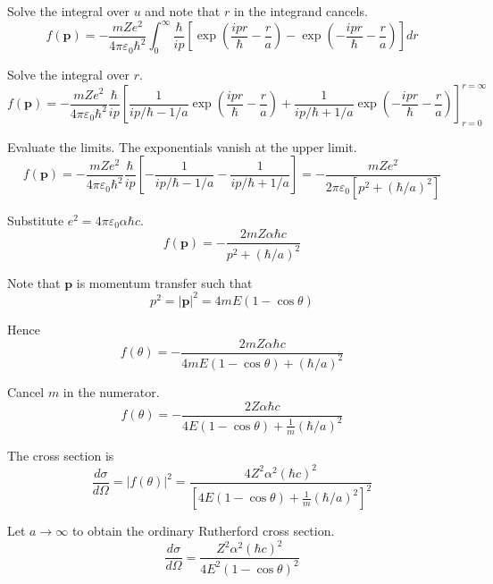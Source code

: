 Solve the integral over $u$ and note that $r$ in the integrand cancels.
\begin{equation*}
f(\mathbf p)=-\frac{mZe^2}{4\pi\varepsilon_0\hbar^2}
\int_0^\infty
\frac{\hbar}{ip}
\left[\exp\left(\frac{ipr}{\hbar}-\frac{r}{a}\right)
-\exp\left(-\frac{ipr}{\hbar}-\frac{r}{a}\right)\right]
dr
\end{equation*}

Solve the integral over $r$.
\begin{equation*}
f(\mathbf p)=-\frac{mZe^2}{4\pi\varepsilon_0\hbar^2}
\frac{\hbar}{ip}
\left[
\frac{1}{ip/\hbar-1/a}
\exp\left(\frac{ipr}{\hbar}-\frac{r}{a}\right)
+\frac{1}{ip/\hbar+1/a}
\exp\left(-\frac{ipr}{\hbar}-\frac{r}{a}\right)
\right]_{r=0}^{r=\infty}
\end{equation*}

Evaluate the limits. The exponentials vanish at the upper limit.
\begin{equation*}
f(\mathbf p)=-\frac{mZe^2}{4\pi\varepsilon_0\hbar^2}
\frac{\hbar}{ip}
\left[
-\frac{1}{ip/\hbar-1/a}
-\frac{1}{ip/\hbar+1/a}
\right]
=-\frac{mZe^2}{2\pi\varepsilon_0\left[p^2+(\hbar/a)^2\right]}
\tag{1}
\end{equation*}

Substitute $e^2=4\pi\varepsilon_0\alpha\hbar c$.
\begin{equation*}
f(\mathbf p)=-\frac{2mZ\alpha\hbar c}{p^2+(\hbar/a)^2}
\end{equation*}

Note that $\mathbf p$ is momentum transfer such that
\begin{equation*}
p^2=|\mathbf p|^2=4mE(1-\cos\theta)
\end{equation*}

Hence
\begin{equation*}
f(\theta)=-\frac{2mZ\alpha\hbar c}{4mE(1-\cos\theta)+(\hbar/a)^2}
\tag{2}
\end{equation*}

Cancel $m$ in the numerator.
\begin{equation*}
f(\theta)=-\frac{2Z\alpha\hbar c}{4E(1-\cos\theta)+\frac{1}{m}(\hbar/a)^2}
\end{equation*}

The cross section is
\begin{equation*}
\frac{d\sigma}{d\Omega}=|f(\theta)|^2
=\frac{4Z^2\alpha^2(\hbar c)^2}{\left[4E(1-\cos\theta)+\frac{1}{m}(\hbar/a)^2\right]^2}
\end{equation*}

Let $a\rightarrow\infty$ to obtain the ordinary Rutherford cross section.
\begin{equation*}
\frac{d\sigma}{d\Omega}
=\frac{Z^2\alpha^2(\hbar c)^2}{4E^2(1-\cos\theta)^2}
\end{equation*}


